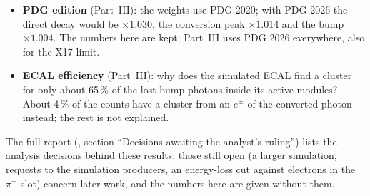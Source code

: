 \documentclass[11pt,a4paper]{article}
\newcommand{\pim}{\ensuremath{\pi^{-}}\xspace}
\newcommand{\code}[1]{\texttt{\detokenize{#1}}}
\begin{document}
\begin{itemize}
      true background pair with a ghost track counts as a fake lepton; moving the latter into the physical background raises
      the simulation by 9--17\,\% per region.
\item \textbf{PDG edition} (Part~III): the weights use PDG 2020; with PDG 2026 the direct decay would be
      $\times1.030$, the conversion peak $\times1.014$ and the bump $\times1.004$. The numbers here are kept; Part~III uses
      PDG 2026 everywhere, also for the X17 limit.
\item \textbf{ECAL efficiency} (Part~III): why does the simulated ECAL find a cluster for only about 65\,\% of the
      lost bump photons inside its active modules? About 4\,\% of the counts have a cluster from an $e^\pm$ of the converted
      photon instead; the rest is not explained.
\end{itemize}
The full report (\code{report_sim.pdf}, section ``Decisions awaiting the analyst's ruling'') lists the analysis decisions
behind these results; those still open (a larger simulation, requests to the simulation producers, an energy-loss cut against
electrons in the \pim slot) concern later work, and the numbers here are given without them.
\end{document}
